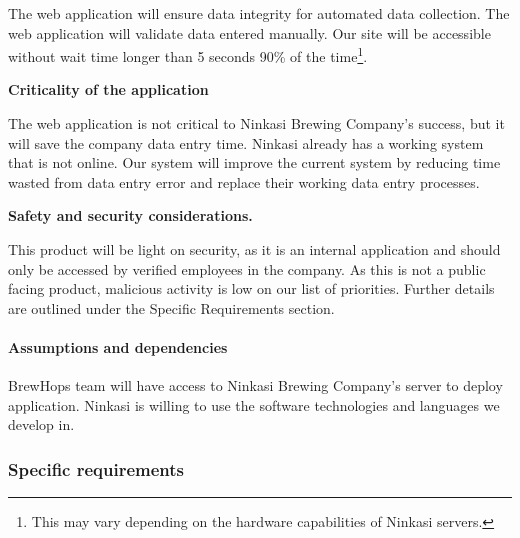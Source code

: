 		The web application will ensure data integrity for automated data collection.
		The web application will validate data entered manually.
		Our site will be accessible without wait time longer than 5 seconds 90\% of the time\footnote{This may vary depending on the hardware capabilities of Ninkasi servers.}.

		\textbf{Criticality of the application}

		The web application is not critical to Ninkasi Brewing Company’s success, but it will save the company data entry time.
		Ninkasi already has a working system that is not online.
		Our system will improve the current system by reducing time wasted from data entry error and replace their working data entry processes.

		\textbf{Safety and security considerations.}

		This product will be light on security, as it is an internal application and should only be accessed by verified employees in the company.
		As this is not a public facing product, malicious activity is low on our list of priorities.
		Further details are outlined under the Specific Requirements section.

	\paragraph{Assumptions and dependencies}
    BrewHops team will have access to Ninkasi Brewing Company's server to deploy application.
    Ninkasi is willing to use the software technologies and languages we develop in.

\subsubsection{Specific requirements}
